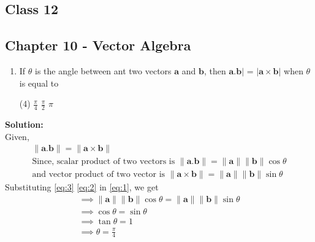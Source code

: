 \documentclass{article}
\newcommand{\norm}[1]{\lVert#1\rVert}
\renewcommand{\vec}[1]{\textbf{#1}}
\begin{document}
\onehalfspacing
\begin{center}
  \section*{\textbf{Class 12}}
  \subsection*{Chapter 10 - Vector Algebra}
\end{center}
\begin{enumerate}
  \item If $\theta$ is the angle between ant two vectors $\vec{a}$ and $\vec{b}$, then $\vec{a}.\vec{b}|$ = $|\vec{a}\times\vec{b}|$ when $\theta$ is equal to
    \begin{tasks}(4)
      \task $\frac{\pi}{4}$
      \task $\frac{\pi}{2}$
      \task $\pi$
      \end{tasks}
\end{enumerate}
  \textbf{Solution:}
  \\
Given,
\begin{align}
  \norm{\vec{a}.\vec{b}}=\norm{\vec{a} \times \vec{b}} \label{eq:1}
  \\
  \text{Since, scalar product of two vectors is } \norm{\vec{a}.\vec{b}} = \norm{\vec{a}}\norm{\vec{b}}\cos{\theta} \label{eq:2}
  \\
  \text{and vector product of two vector is }\norm{\vec{a} \times \vec{b}} = \norm{\vec{a}}\norm{\vec{b}}\sin{\theta} \label{eq:3}
\end{align}
Substituting \eqref{eq:3} \eqref{eq:2} in \eqref{eq:1}, we get
\\
\begin{align}
  \implies \norm{\vec{a}}\norm{\vec{b}}\cos{\theta} = \norm{\vec{a}}\norm{\vec{b}}\sin{\theta}\\
  \implies \cos{\theta} = \sin{\theta}\\
  \implies \tan{\theta} = 1\\
  \implies \theta = \frac{\pi}{4}
\end{align}
\end{document}
